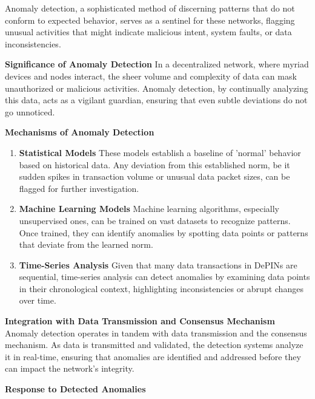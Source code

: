 \documentclass{article}
\begin{document}
Anomaly detection, a sophisticated method of discerning patterns that do not conform to expected behavior, serves as a sentinel for these networks, flagging unusual activities that might indicate malicious intent, system faults, or data inconsistencies.

\textbf{Significance of Anomaly Detection}
 In a decentralized network, where myriad devices and nodes interact, the sheer volume and complexity of data can mask unauthorized or malicious activities. Anomaly detection, by continually analyzing this data, acts as a vigilant guardian, ensuring that even subtle deviations do not go unnoticed.

\textbf{Mechanisms of Anomaly Detection}

\begin{enumerate}
\item \textbf{Statistical Models} These models establish a baseline of 'normal' behavior based on historical data. Any deviation from this established norm, be it sudden spikes in transaction volume or unusual data packet sizes, can be flagged for further investigation.

\item \textbf{Machine Learning Models} Machine learning algorithms, especially unsupervised ones, can be trained on vast datasets to recognize patterns. Once trained, they can identify anomalies by spotting data points or patterns that deviate from the learned norm.

\item \textbf{Time-Series Analysis}
 Given that many data transactions in DePINs are sequential, time-series analysis can detect anomalies by examining data points in their chronological context, highlighting inconsistencies or abrupt changes over time.

\end{enumerate}


\textbf{Integration with Data Transmission and Consensus Mechanism}
Anomaly detection operates in tandem with data transmission and the consensus mechanism. As data is transmitted and validated, the detection systems analyze it in real-time, ensuring that anomalies are identified and addressed before they can impact the network's integrity.

\textbf{Response to Detected Anomalies}
\end{document}
